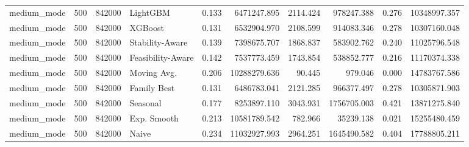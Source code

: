 \begin{table}
{\begin{tabular}{lrrlrrrrrr}
medium\_mode &     500 & 842000 &          LightGBM & 0.133 &     6471247.895 &             2114.424 &         978247.388 &           0.276 &         10348997.357 \\
medium\_mode &     500 & 842000 &           XGBoost & 0.131 &     6532904.970 &             2108.599 &         914083.346 &           0.278 &         10307160.048 \\
medium\_mode &     500 & 842000 &   Stability-Aware & 0.139 &     7398675.707 &             1868.837 &         583902.762 &           0.240 &         11025796.548 \\
medium\_mode &     500 & 842000 & Feasibility-Aware & 0.142 &     7537773.459 &             1743.854 &         538852.777 &           0.216 &         11170374.338 \\
medium\_mode &     500 & 842000 &       Moving Avg. & 0.206 &    10288279.636 &               90.445 &            979.046 &           0.000 &         14783767.586 \\
medium\_mode &     500 & 842000 &       Family Best & 0.131 &     6486783.041 &             2121.285 &         966377.497 &           0.278 &         10305871.903 \\
medium\_mode &     500 & 842000 &          Seasonal & 0.177 &     8253897.110 &             3043.931 &        1756705.003 &           0.421 &         13871275.840 \\
medium\_mode &     500 & 842000 &       Exp. Smooth & 0.213 &    10581789.542 &              782.966 &          35239.138 &           0.021 &         15255480.459 \\
medium\_mode &     500 & 842000 &             Naive & 0.234 &    11032927.993 &             2964.251 &        1645490.582 &           0.404 &         17788805.211 \\
\bottomrule
\end{tabular}
}

\end{table}
